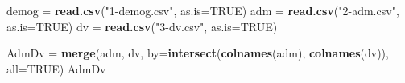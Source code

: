 \documentclass[11pt,]{krantz}
\makeatletter
\newenvironment{Shaded}{\begin{snugshade}}{\end{snugshade}}
\newcommand{\KeywordTok}[1]{\textcolor[rgb]{0.13,0.29,0.53}{\textbf{#1}}}
\newcommand{\DataTypeTok}[1]{\textcolor[rgb]{0.13,0.29,0.53}{#1}}
\newcommand{\StringTok}[1]{\textcolor[rgb]{0.31,0.60,0.02}{#1}}
\newcommand{\OtherTok}[1]{\textcolor[rgb]{0.56,0.35,0.01}{#1}}
\newcommand{\NormalTok}[1]{#1}
\newenvironment{kframe}{%
\medskip{}
\setlength{\fboxsep}{.8em}
 \def\at@end@of@kframe{}%
 \ifinner\ifhmode%
  \def\at@end@of@kframe{\end{minipage}}%
  \begin{minipage}{\columnwidth}%
 \fi\fi%
 \def\FrameCommand##1{\hskip\@totalleftmargin \hskip-\fboxsep
 \colorbox{shadecolor}{##1}\hskip-\fboxsep
     \hskip-\linewidth \hskip-\@totalleftmargin \hskip\columnwidth}%
 \MakeFramed {\advance\hsize-\width
   \@totalleftmargin\z@ \linewidth\hsize
   \@setminipage}}%
 {\par\unskip\endMakeFramed%
 \at@end@of@kframe}
\renewenvironment{Shaded}{\begin{kframe}}{\end{kframe}}
\theoremstyle{definition}
\theoremstyle{definition}
\theoremstyle{remark}
\makeatother
\begin{document}
\begin{Shaded}
\begin{Highlighting}[]
\NormalTok{demog =}\StringTok{ }\KeywordTok{read.csv}\NormalTok{(}\StringTok{"1-demog.csv"}\NormalTok{, }\DataTypeTok{as.is=}\OtherTok{TRUE}\NormalTok{)}
\NormalTok{adm =}\StringTok{ }\KeywordTok{read.csv}\NormalTok{(}\StringTok{"2-adm.csv"}\NormalTok{, }\DataTypeTok{as.is=}\OtherTok{TRUE}\NormalTok{)}
\NormalTok{dv =}\StringTok{ }\KeywordTok{read.csv}\NormalTok{(}\StringTok{"3-dv.csv"}\NormalTok{, }\DataTypeTok{as.is=}\OtherTok{TRUE}\NormalTok{)}

\NormalTok{AdmDv =}\StringTok{ }\KeywordTok{merge}\NormalTok{(adm, dv, }\DataTypeTok{by=}\KeywordTok{intersect}\NormalTok{(}\KeywordTok{colnames}\NormalTok{(adm), }\KeywordTok{colnames}\NormalTok{(dv)), }\DataTypeTok{all=}\OtherTok{TRUE}\NormalTok{)}
\NormalTok{AdmDv}
\end{Highlighting}
\end{Shaded}
\end{document}

